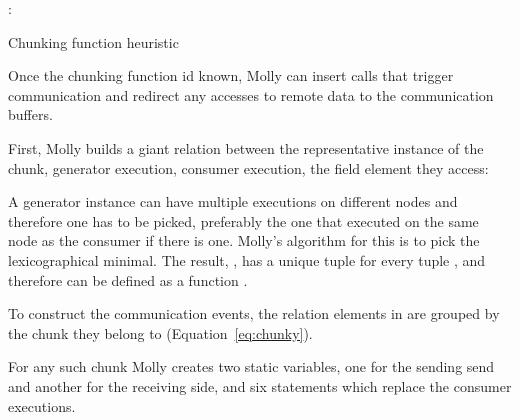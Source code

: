 \documentclass{sigplanconf}
\begin{document}

\begin{algorithm}
\SetAlgoLined
{}

   \Return \KwLambda:  \;
   
  \caption{Chunking function heuristic}\label{alg:chunking}
\end{algorithm}

Once the chunking function id known, Molly can insert calls that trigger communication and redirect any accesses to remote data to the communication buffers.

First, Molly builds a giant relation between the representative instance of the chunk, generator execution, consumer execution, the field element they access:



A generator instance can have multiple executions on different nodes and therefore one has to be picked, preferably the one that executed on the same node as the consumer if there is one. Molly's algorithm for this is to pick the lexicographical minimal. The result, , has a unique tuple  for every tuple , and therefore can be defined as a function .

To construct the communication events, the relation elements in  are grouped by the chunk they belong to (Equation~\ref{eq:chunky}).

\begin{figure*}[tb]

  
\end{figure*}



For any such chunk Molly creates two static variables, one for the sending send and another for the receiving side, and six statements which replace the consumer executions.
\end{document}
